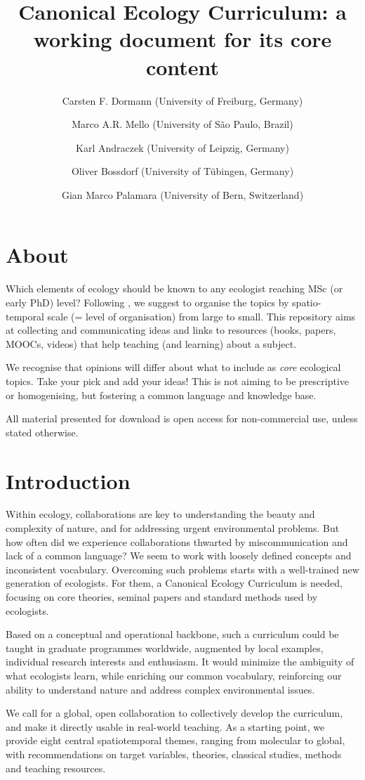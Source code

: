 \documentclass[english,11pt,a4paper, landscape]{article}
\title{Canonical Ecology Curriculum: a working document for its core content}
\author{Carsten F. Dormann (University of Freiburg, Germany)\and Marco A.R. Mello (University of S{\~{a}}o Paulo, Brazil) \and Karl Andraczek (University of Leipzig, Germany) \and Oliver Bossdorf (University of T{\"u}bingen, Germany) \and Gian Marco Palamara (University of Bern, Switzerland)}
\begin{document}
\maketitle

\section{About}
Which elements of ecology should be known to any ecologist reaching MSc (or early PhD) level? Following \citet{Dormann2023}, we suggest to organise the topics by spatio-temporal scale (= level of organisation) from large to small. This repository aims at collecting and communicating ideas and links to resources (books, papers, MOOCs, videos) that help teaching (and learning) about a subject.

We recognise that opinions will differ about what to include as \emph{core} ecological topics. Take your pick and add your ideas! This is not aiming to be prescriptive or homogenising, but fostering a common language and knowledge base.

All material presented for download is open access for non-commercial use, unless stated otherwise.


\section{Introduction}
Within ecology, collaborations are key to understanding the beauty and complexity of nature, and for addressing urgent environmental problems. But how often did we experience collaborations thwarted by miscommunication and lack of a common language? We seem to work with loosely defined concepts and inconsistent vocabulary. Overcoming such problems starts with a well-trained new generation of ecologists. For them, a Canonical Ecology Curriculum is needed, focusing on core theories, seminal papers and standard methods used by ecologists.

Based on a conceptual and operational backbone, such a curriculum could be taught in graduate programmes worldwide, augmented by local examples, individual research interests and enthusiasm. It would minimize the ambiguity of what ecologists learn, while enriching our common vocabulary, reinforcing our ability to understand nature and address complex environmental issues. 

We call for a global, open collaboration to collectively develop the curriculum, and make it directly usable in real-world teaching. As a starting point, we provide eight central spatiotemporal themes, ranging from molecular to global, with recommendations on target variables, theories, classical studies, methods and teaching resources. 
\end{document}
